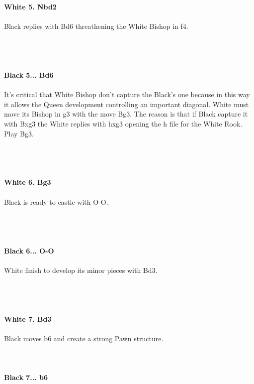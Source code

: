 \documentclass{article}
\begin{document}
\\

\\
\\
\textbf{White 5. Nbd2}\\
\\
Black replies with Bd6 threathening the White Bishop in f4.\\\\
\\

\\
\\
\textbf{Black 5... Bd6}\\
\\
It's critical that White Bishop don't capture the Black's one because in this way it allows the Queen development controlling an important diagonal. White must move its Bishop in g3 with the move Bg3. The reason is that if Black capture it with Bxg3 the White replies with hxg3 opening the h file for the White Rook. Play Bg3.\\\\
\\

\\
\\
\textbf{White 6. Bg3}\\
\\
Black is ready to castle with O-O.\\\\
\\

\\
\\
\textbf{Black 6... O-O}\\
\\
White finish to develop its minor pieces with Bd3.\\\\
\\

\\
\\
\textbf{White 7. Bd3}\\
\\
Black moves b6 and create a strong Pawn structure.\\
\\

\\
\\
\textbf{Black 7... b6}\\
\end{document}
